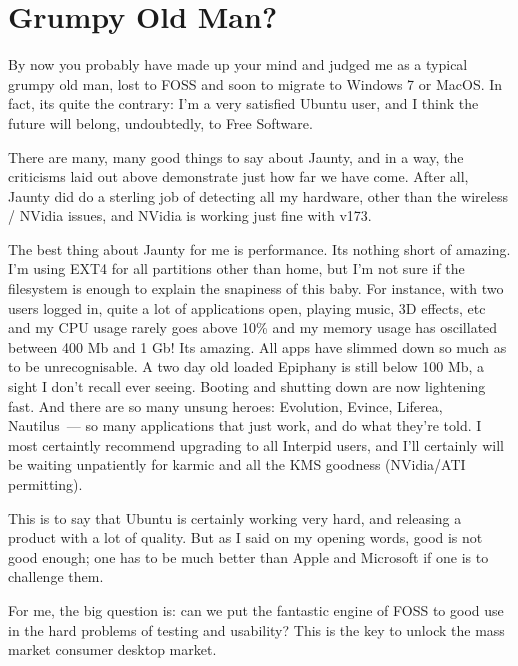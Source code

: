 \documentclass{memoir}
\begin{document}
\section{Grumpy Old Man?}

By now you probably have made up your mind and judged me as a typical
grumpy old man, lost to FOSS and soon to migrate to Windows 7 or
MacOS. In fact, its quite the contrary: I'm a very satisfied Ubuntu
user, and I think the future will belong, undoubtedly, to Free
Software.

There are many, many good things to say about Jaunty, and in a way,
the criticisms laid out above demonstrate just how far we have
come. After all, Jaunty did do a sterling job of detecting all my
hardware, other than the wireless / NVidia issues, and NVidia is
working just fine with v173.

The best thing about Jaunty for me is performance. Its nothing short
of amazing. I'm using EXT4 for all partitions other than home, but I'm
not sure if the filesystem is enough to explain the snapiness of this
baby. For instance, with two users logged in, quite a lot of
applications open, playing music, 3D effects, etc and my CPU usage
rarely goes above 10\% and my memory usage has oscillated between 400
Mb and 1 Gb! Its amazing. All apps have slimmed down so much as to be
unrecognisable. A two day old loaded Epiphany is still below 100 Mb, a
sight I don't recall ever seeing. Booting and shutting down are now
lightening fast. And there are so many unsung heroes: Evolution,
Evince, Liferea, Nautilus~--- so many applications that just work, and
do what they're told. I most certaintly recommend upgrading to all
Interpid users, and I'll certainly will be waiting unpatiently for
karmic and all the KMS goodness (NVidia/ATI permitting).

This is to say that Ubuntu is certainly working very hard, and
releasing a product with a lot of quality. But as I said on my opening
words, good is not good enough; one has to be much better than Apple
and Microsoft if one is to challenge them.

For me, the big question is: can we put the fantastic engine of FOSS
to good use in the hard problems of testing and usability? This is the
key to unlock the mass market consumer desktop market.
\end{document}
